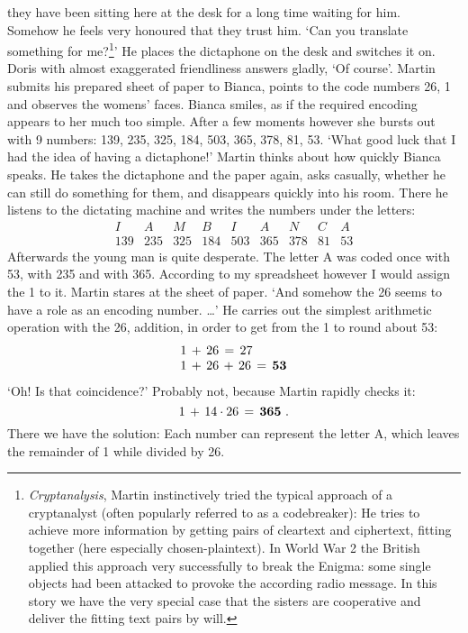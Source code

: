 they have been sitting here at the desk for a long time waiting for him. \\
Somehow he feels very honoured that they trust him. 
`Can you translate something for me?\footnote{{\em Cryptanalysis\/}, Martin instinctively tried 
the typical approach of a cryptanalyst (often popularly referred to as a codebreaker): He tries to achieve more information by getting pairs of 
cleartext and ciphertext, fitting together (here especially chosen-plaintext). 
In World War 2 the British applied this approach very successfully to break the Enigma: some 
single objects had been attacked to provoke the according radio message.
In this story we have the very special case that the sisters are cooperative and deliver the 
fitting text pairs by will.}'
He places the dictaphone on the desk and switches it on. 
Doris with almost exaggerated friendliness answers gladly, `Of course'.
Martin submits his prepared sheet of paper to Bianca, points to the code numbers 26, 1 and 
observes the womens' faces. 
Bianca smiles, as if the required encoding appears to her much too simple. 
After a few moments however she bursts out with 9 numbers: 139, 235, 325, 184, 503, 365, 378, 81, 53. 
`What good luck that I had the idea of having a dictaphone!' Martin thinks about how quickly Bianca speaks. 
He takes the dictaphone and the paper again, asks casually, whether he can still do something 
for them, and disappears quickly into his room. 
There he listens to the dictating machine and writes the numbers under the letters: 
\[
\begin{array}{cccccccccccc}
I & A & M & B & I & A & N & C & A \\
139 & 235 & 325 & 184 & 503 & 365 & 378 & 81 & 53
\end{array} 
\]
Afterwards the young man is quite desperate.
The letter A was coded once with 53, with 235 and with 365. 
According to my spreadsheet however I would assign the 1 to it. 
Martin stares at the sheet of paper. 
`And somehow the 26 seems to have a role as an encoding number. \dots' 
He carries out the simplest arithmetic operation with the 26, addition, in order to get from the 1 to round about 53: 
\[
\begin{array}{l}
1\,+\,26\,=\,27 \\
1\,+\,26\,+\,26\,=\,{\bf 53}
\end{array} 
\]
`Oh! Is that coincidence?' 
Probably not, because Martin rapidly checks it: 
\[
1\, +\, 14\cdot 26\, =\, {\bf 365}\,\,.
\]
There we have the solution: Each number can represent the letter A, which leaves the remainder of 1 while divided by 26. 

